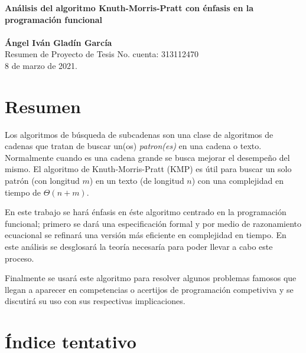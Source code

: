 \documentclass[letterpaper,10pt]{article}
\begin{document}
\noindent
\large
\textbf{Análisis del algoritmo Knuth-Morris-Pratt con énfasis en la programación funcional} \\\\
\textbf{Ángel Iván Gladín García} \\
\normalsize Resumen de Proyecto de Tesis       \hfill No. cuenta: 313112470\\
\hfill 8 de marzo de 2021.\\

\vspace*{-15pt}

\section{Resumen}
Los algoritmos de búsqueda de subcadenas son una clase de algoritmos de cadenas que tratan de
buscar un(os) \emph{patron(es)} en una cadena o texto. Normalmente cuando es una cadena grande se
busca mejorar el desempeño del mismo. El algoritmo de Knuth-Morris-Pratt (KMP) es útil para buscar un
solo patrón (con longitud $m$) en un texto (de longitud $n$) con una complejidad en tiempo de
$\Theta(n + m)$.

En este trabajo se hará énfasis en éste algoritmo centrado en la programación funcional; primero se
dará una especificación formal y por medio de razonamiento ecuacional se refinará una versión
más eficiente en complejidad en tiempo. En este análisis se desglosará la teoría necesaría para
poder llevar a cabo este proceso.

Finalmente se usará este algoritmo para resolver algunos problemas famosos que llegan a aparecer
en competencias o acertijos de programación competiviva y se discutirá su uso con sus respectivas
implicaciones.

\section{Índice tentativo}
\end{document}
